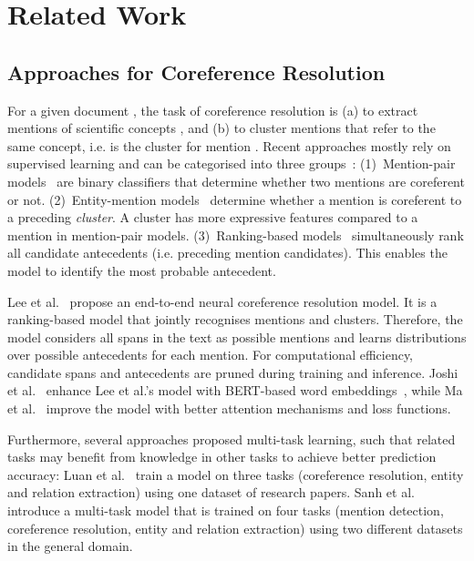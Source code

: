 \documentclass[runningheads]{llncs}
\begin{document}
\section{Related Work}
\label{sec:related_work}


\subsection{Approaches for Coreference Resolution}
For a given document , the task of coreference resolution is (a) to extract mentions of scientific concepts , and (b) to cluster mentions that refer to the same concept, i.e.  is the cluster for mention . 
Recent approaches mostly rely on supervised learning and can be categorised into three groups~\cite{Ng2017Coreference}:
(1)~Men\-tion-pair models~\cite{NgC02Coreference,SoonNL01Coref} are binary classifiers that determine whether two mentions are coreferent or not. 
(2)~Entity-mention models~\cite{ClarkM15Coref,RahmanN09Coref} determine whether a mention is coreferent to a preceding \emph{cluster}. A cluster has more expressive features compared to a mention in mention-pair models. 
(3)~Ranking-based models~\cite{DenisB08Coref,Lee2017EndtoendNC,MarasovicBOF17Coref} simultaneously rank all candidate antecedents (i.e. preceding mention candidates). This enables the model to identify the most probable antecedent.  

Lee et al.~\cite{Lee2017EndtoendNC,LeeHZ18Coreference} propose an end-to-end neural coreference resolution model. It is a ranking-based model that jointly recognises mentions and clusters. Therefore, the model considers all spans in the text as possible mentions and learns distributions over possible antecedents for each mention. For computational efficiency, candidate spans and antecedents are pruned during training and inference.
Joshi et al.~\cite{Joshi2020BFCR} enhance Lee et al.'s model with BERT-based word embeddings~\cite{Devlin2018BERTPO}, while Ma et al.~\cite{Ma0LHPSL20JointlyCoreference} improve the model with better attention mechanisms and loss functions. 

Furthermore, several approaches proposed multi-task learning, such that related tasks may benefit from knowledge in other tasks to achieve better prediction accuracy:
Luan et al.~\cite{Luan2018MultiTaskIO,WaddenWLH19DyGIE} train a model on three tasks (coreference resolution, entity and relation extraction) using one dataset of research papers. 
Sanh et al.~\cite{Sanh2018AHM} introduce a multi-task model that is trained on four tasks (mention detection, coreference resolution, entity and relation extraction) using two different datasets in the general domain. 
\end{document}
